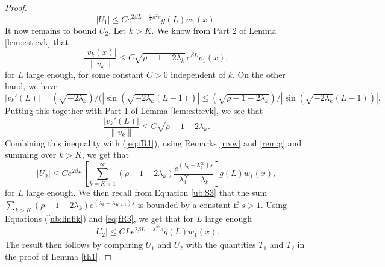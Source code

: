 \documentclass[11pt]{article}
\theoremstyle{plain}
\newcommand\linf{\lambda_1^\infty}
\begin{document}
\begin{proof}
 \begin{equation*}
   \left| U_1\right|\leqslant C e^{2\beta L-\frac{5}{8}\pi^2 s}g(L)w_1(x).
   \label{dis:t1}
\end{equation*}
It now remains to bound $U_2$. Let $k>K$. We know from Part 2 of Lemma \ref{lem:est:evk} that \begin{equation}
    \frac{|v_k(x)|}{\|v_k\|}\leqslant C\sqrt{\rho-1-2\lambda_k}\,e^{{\beta}L}v_1(x),
    \label{eq:fR1}
\end{equation}
for $L$ large enough, for some constant $C>0$ independent of $k$. On the other hand, we have $|v_k'(L)|=(\sqrt{-2\lambda_k})/(|\sin(\sqrt{-2\lambda_k}(L-1))|\leqslant (\sqrt{\rho-1-2\lambda_k})/|\sin(\sqrt{-2\lambda_k}(L-1))|.$ Putting this together with Part 1 of Lemma \ref{lem:est:evk}, we see that
\begin{equation*}
\frac{|v_k'(L)|}{\|v_k\|}\leqslant C\sqrt{\rho-1-2\lambda_k}.
\end{equation*}
Combining this inequality with 
(\ref{eq:fR1}), using Remarks \ref{r:vw} and \ref{rem:g} and summing over $k>K$, we get that
\begin{equation}
  \left|U_2\right|\leqslant Ce^{2{\beta} L}\left[\sum_{k=K+1}^\infty(\rho-1-2\lambda_k)\frac{e^{(\lambda_k-\linf) s }}{\linf-\lambda_k}\right]g(L)w_1(x), \label{eq;fR3}
\end{equation}
for $L$ large enough.
We then recall from Equation \eqref{ub:S3} that the sum
 $\sum_{k>K} (\rho-1-2\lambda_{k})e^{(\lambda_k-\lambda_{K+1}) s }$
  is bounded by a constant if $ s >1$. Using Equations (\ref{ub:linflk}) and \eqref{eq;fR3}, we get that for  $L$ large enough
  \begin{eqnarray*}
   \left|U_2\right|
   \leqslant CLe^{2{\beta}L-\linf  s }g(L)w_1(x). \label{dist:t2}
   \label{dist:t2}
\end{eqnarray*}
The result then follows by comparing $U_1$ and $U_2$ with the quantities $T_1$ and $T_2$ in the proof of Lemma \ref{th1}.
\end{proof}   
\end{document}
